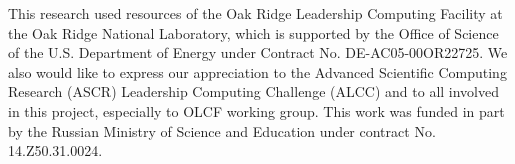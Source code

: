This research used resources of the Oak Ridge Leadership Computing Facility at the Oak Ridge National Laboratory, which is supported by the Office of Science of the U.S. Department of Energy under Contract No. DE-AC05-00OR22725. We also would like to express our appreciation to the Advanced Scientific Computing Research (ASCR) Leadership Computing Challenge (ALCC) and to all involved in this project, especially to OLCF working group. This work was funded in part by the Russian Ministry of Science and Education under contract No. 14.Z50.31.0024.